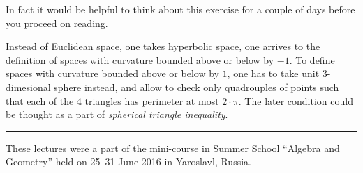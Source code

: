 In fact it would be helpful to think about this exercise for a couple of days before you proceed on reading.

Instead of Euclidean space, one takes hyperbolic space,
one arrives to the definition of spaces with curvature bounded above or below by $-1$.
To define spaces with curvature bounded above or below by $1$,
one has to take unit 3-dimesional sphere instead,
and allow to check only quadrouples of points such that each of the 4 triangles has perimeter at most $2\cdot\pi$.
The later condition could be thought as a part of \emph{spherical triangle inequality}.

\medskip
\noindent\rule{2cm}{0.4pt}

These lectures were a part of the mini-course in Summer School ``Algebra and Geometry'' held on 25--31 June 2016 in Yaroslavl, Russia.







